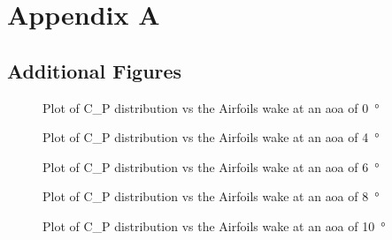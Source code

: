 \chapter{Appendix A}

\section{Additional Figures} \label{sec:additional_figures}

\begin{figure}[htpb]
    \centering
    
    \caption[plot of the coefficient of pressure vs the angle of attack at zero degrees.]{Plot of \gls{C_P} distribution vs the Airfoils wake at an \acrshort{aoa} of \qty{0} {\degree}}
    \label{fig:C_p Distribution of Airfoil Wake at 0° AOA.svg}
\end{figure}

\begin{figure}[htpb]
    \centering
    
    \caption[plot of the coefficient of pressure vs the angle of attack at four degrees.]{Plot of \gls{C_P} distribution vs the Airfoils wake at an \acrshort{aoa} of \qty{4} {\degree}}
    \label{fig:C_p Distribution of Airfoil Wake at 4° AOA.svg}
\end{figure}

\begin{figure}[htpb]
    \centering
    
    \caption[plot of the coefficient of pressure vs the angle of attack at six degrees.]{Plot of \gls{C_P} distribution vs the Airfoils wake at an \acrshort{aoa} of \qty{6} {\degree}}
    \label{fig:C_p Distribution of Airfoil Wake at 6° AOA.svg}
\end{figure}

\begin{figure}[htpb]
    \centering
    
    \caption[plot of the coefficient of pressure vs the angle of attack at eight degrees.]{Plot of \gls{C_P} distribution vs the Airfoils wake at an \acrshort{aoa} of \qty{8} {\degree}}
    \label{fig:C_p Distribution of Airfoil Wake at 8° AOA.svg}
\end{figure}

\begin{figure}[htpb]
    \centering
    
    \caption[plot of the coefficient of pressure vs the angle of attack at 10 degrees.]{Plot of \gls{C_P} distribution vs the Airfoils wake at an \acrshort{aoa} of \qty{10} {\degree}}
    \label{fig:C_p Distribution of Airfoil Wake at 10° AOA.svg}
\end{figure}


